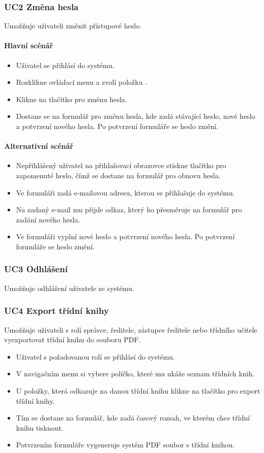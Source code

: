 \subsubsection*{UC2 Změna hesla}
Umožňuje uživateli změnit přístupové heslo.
\paragraph{Hlavní scénář}
\begin{itemize}
    \item Uživatel se přihlásí do systému.
    \item Rozklikne ovládací menu a zvolí položku .
    \item Klikne na tlačítko pro změnu hesla.
    \item Dostane se na formulář pro změnu hesla, kde zadá stávající heslo, nové heslo a potvrzení nového hesla. Po potvrzení formuláře se heslo změní.
\end{itemize}

\paragraph{Alternativní scénář}
\begin{itemize}
    \item Nepřihlášený uživatel na přihlašovací obrazovce stiskne tlačítko pro zapomenuté heslo, čímž se dostane na formulář pro obnovu hesla.
    \item Ve formuláři zadá e-mailovou adresu, kterou se přihlašuje do systému.
    \item Na zadaný e-mail mu přijde odkaz, který ho přesměruje na formulář pro zadání nového hesla. 
    \item Ve formuláři vyplní nové heslo a potvrzení nového hesla. Po potvrzení formuláře se heslo změní.
\end{itemize}

\subsubsection*{UC3 Odhlášení}
Umožňuje odhlášení uživatele ze systému.

\subsubsection*{UC4 Export třídní knihy}
Umožňuje uživateli s rolí správce, ředitele, zástupce ředitele nebo třídního učitele vyexportovat třídní knihu do souboru PDF.
\begin{itemize}
    \item Uživatel s požadovanou rolí se přihlásí do systému.
    \item V navigačním menu si vybere políčko, které mu ukáže seznam třídních knih.
    \item U položky, která odkazuje na danou třídní knihu klikne na tlačítko pro export třídní knihy.
    \item Tím se dostane na formulář, kde zadá časový rozsah, ve kterém chce třídní knihu tisknout.
    \item Potvrzením formuláře vygeneruje systém PDF soubor s třídní knihou.
\end{itemize}

